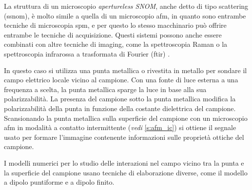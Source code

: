 \documentclass[../main.tex]{subfiles}
\begin{document}
La struttura di un microscopio \textit{apertureless SNOM}, anche detto di tipo scattering (\acrshort{ssnom}),  è molto simile a quella di un microscopio \acrshort{afm}, in quanto sono entrambe tecniche di microscopia \acrshort{spm}, e per questo lo stesso macchinario può offrire entrambe le tecniche di acquisizione. Questi sistemi possono anche essere combinati con altre tecniche di imaging, come la spettroscopia Raman\cite{zhang_2017} o la spettroscopia infrarossa a trasformata di Fourier (\acrshort{ftir}) \cite{rotenberg_2014}.

In questo caso si utilizza una punta metallica o rivestita in metallo per sondare il campo elettrico locale vicino al campione. Con una fonte di luce esterna a una frequenza a scelta, la punta metallica sparge la luce in base alla sua polarizzabilità. La presenza del campione sotto la punta metallica modifica la polarizzabilità della punta in funzione della costante dielettrica del campione. Scansionando la punta metallica sulla superficie del campione con un microscopio \acrshort{afm} in modalità a contatto intermittente (\textit{vedi} \ref{s:afm_ic}) si ottiene il segnale usato per formare l'immagine contenente informazioni sulle proprietà ottiche del campione.\cite{wang_2015}

I modelli numerici per lo studio delle interazioni nel campo vicino tra la punta e la superficie del campione usano tecniche di elaborazione diverse, come il modello a dipolo puntiforme e a dipolo finito.\cite{cvitkovic_2007}\\
\end{document}
